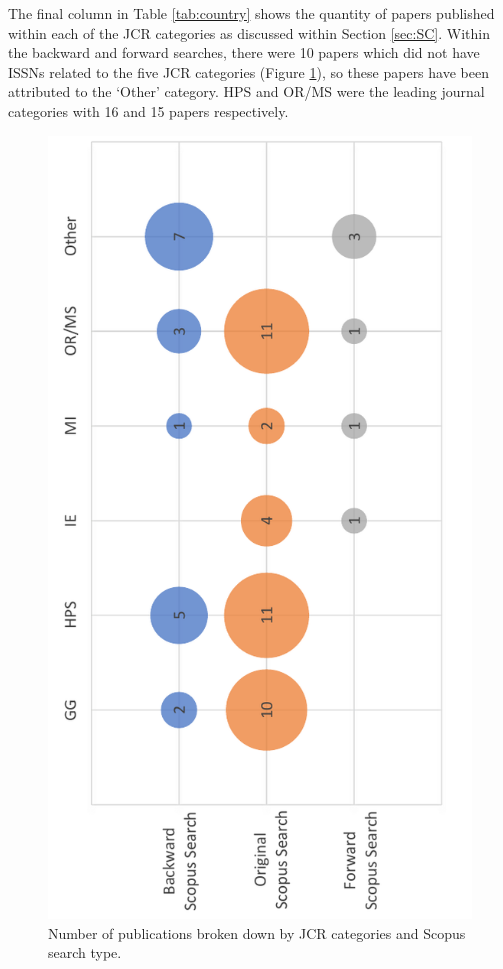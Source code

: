 \documentclass[../thesis.tex]{subfiles}
\begin{document}
The final column in Table \ref{tab:country} shows the quantity of papers published within each of the JCR categories as discussed within Section \ref{sec:SC}. Within the backward and forward searches, there were 10 papers which did not have ISSNs related to the five JCR categories (Figure \ref{fig:journalsearch1}), so these papers have been attributed to the `Other' category. HPS and OR/MS were the leading journal categories with 16 and 15 papers respectively.

\begin{figure}[H]
\centering
  \includegraphics[scale = 0.6,angle=270]{Chapter2/Figures/Journal search chapter1.pdf}
  \caption{Number of publications broken down by JCR categories and Scopus search type.}
\label{fig:journalsearch1}  
\end{figure}
\end{document}
